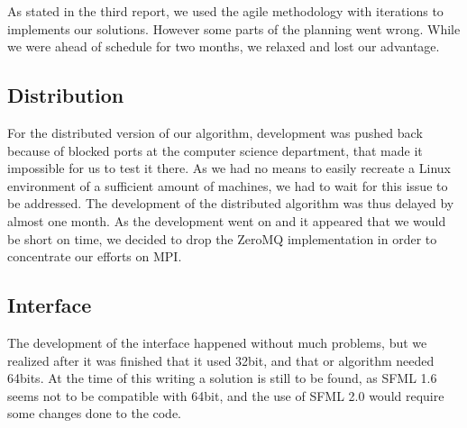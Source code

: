 As stated in the third report, we used the agile methodology with iterations to implements our solutions. However some parts of the planning went wrong. While we were ahead of schedule for two months, we relaxed and lost our advantage.

\subsection{Distribution}
For the distributed version of our algorithm, development was pushed back because of blocked ports at the computer science department, that made it impossible for us to test it there.
As we had no means to easily recreate a Linux environment of a sufficient amount of machines, we had to wait for this issue to be addressed. The development of the distributed algorithm was thus delayed by almost one month.
As the development went on and it appeared that we would be short on time, we decided to drop the ZeroMQ implementation in order to concentrate our efforts on MPI.

\subsection{Interface}
The development of the interface happened without much problems, but we realized after it was finished that it used 32bit, and that or algorithm needed 64bits.
At the time of this writing a solution is still to be found, as SFML 1.6 seems not to be compatible with 64bit, and the use of SFML 2.0 would require some changes done to the code.